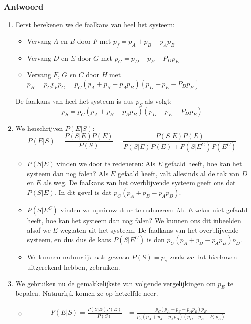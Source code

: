 \documentclass[main.tex]{subfiles}
\begin{document}
\subsubsection*{Antwoord}
\begin{enumerate}
\item Eerst berekenen we de faalkans van heel het systeem:
  \begin{itemize}
  \item Vervang $A$ en $B$ door $F$ met $p_{f} = p_{A} + p_{B} - p_{A}p_{B}$
  \item Vervang $D$ en $E$ door $G$ met $p_{G} = p_{D} + p_{E} - P_{D}p_{E}$
  \item Vervang $F$, $G$ en $C$ door $H$ met $p_{H} = p_{C}p_{F}p_{G} = p_{C}(p_{A} + p_{B} - p_{A}p_{B})(p_{D} + p_{E} - P_{D}p_{E})$
  \end{itemize}
  De faalkans van heel het systeem is dus $p_{S}$ als volgt:
  \[ p_{S} = p_{C}(p_{A} + p_{B} - p_{A}p_{B})(p_{D} + p_{E} - P_{D}p_{E})\]
\item We herschrijven $P(E|S)$:
  \[ P(E | S) = \frac{P(S | E)P(E)}{P(S)} = \frac{P(S|E)P(E)}{P(S|E)P(E) + P(S|E^{C})P(E^{C})} \]
  \begin{itemize}
  \item $P(S|E)$ vinden we door te redeneren:
    Als $E$ gefaald heeft, hoe kan het systeem dan nog falen?
    Als $E$ gefaald heeft, valt allesinds al de tak van $D$ en $E$ als weg.
    De faalkans van het overblijvende systeem geeft ons dat $P(S|E)$.
    In dit geval is dat $p_{C}(p_{A}+p_{B}-p_{A}p_{B})$.
  \item $P(S|E^{C})$ vinden we opnieuw door te redeneren:
    Als $E$ zeker niet gefaald heeft, hoe kan het systeem dan nog falen?
    We kunnen ons dit inbeelden alsof we $E$ weglaten uit het systeem.
    De faalkans van het overblijvende systeem, en dus dus de kans $P(S|E^{C})$ is dan $p_{C}(p_{A} + p_{B} - p_{A}p_{B})p_{D}$.
  \item We kunnen natuurlijk ook gewoon $P(S)=p_{s}$ zoals we dat hierboven uitgerekend hebben, gebruiken.
  \end{itemize}
\item We gebruiken nu de gemakkelijkste van volgende vergelijkingen om $p_{E}$ te bepalen. Natuurlijk komen ze op hetzelfde neer. 
  \begin{itemize}
  \item
    \begin{align*}
      P(E | S) = \frac{P(S | E)P(E)}{P(S)}
      &= \frac{p_{C}(p_{A}+p_{B}-p_{A}p_{B})p_{E}}{p_{C}(p_{A} + p_{B} - p_{A}p_{B})(p_{D} + p_{E} - P_{D}p_{E})}\\

\end{align*}
\end{itemize}
\end{enumerate}
\end{document}
